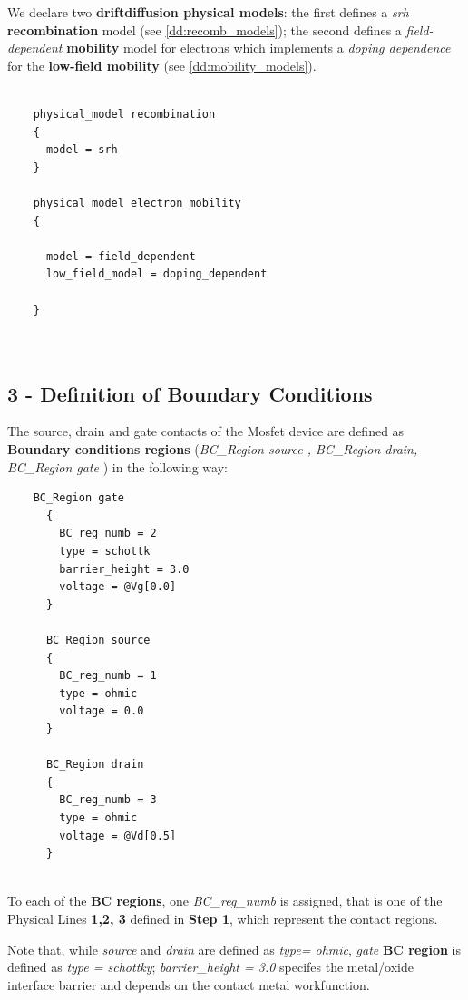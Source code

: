 We declare two \textbf{driftdiffusion physical models}:
 the  first defines a   \textit{srh} \textbf{recombination}  model (see \ref{dd:recomb_models}); the  second 
defines a \textit{field-dependent} \textbf{mobility} model for  electrons which implements a \textit{doping  dependence} for the \textbf{low-field  mobility} (see \ref{dd:mobility_models}).


\begin{verbatim}

    physical_model recombination
    {
      model = srh
    }

    physical_model electron_mobility
    {

      model = field_dependent
      low_field_model = doping_dependent   

    }



\end{verbatim}

\subsection* {3 - Definition of Boundary Conditions}
The source, drain  and gate contacts of the Mosfet device  are defined as \textbf{Boundary conditions regions} (\textit{BC\_Region source , BC\_Region drain, BC\_Region gate }) in the following way:

\begin{verbatim}
    BC_Region gate
      {
        BC_reg_numb = 2
        type = schottk
        barrier_height = 3.0
        voltage = @Vg[0.0]
      }

      BC_Region source
      {
        BC_reg_numb = 1
        type = ohmic
        voltage = 0.0
      }
 
      BC_Region drain
      {
        BC_reg_numb = 3
        type = ohmic
        voltage = @Vd[0.5]
      }


\end{verbatim}

To each of the  \textbf{BC regions}, one \textit{BC\_reg\_numb} is  assigned,  that  is  one  of the Physical Lines \textbf{1,2, 3} defined in \textbf{Step 1}, which represent the contact regions.

Note that, while \textit{source} and \textit{drain} are defined as \textit{type= ohmic},  \textit{gate} \textbf{BC region} is defined as \textit{type = schottky};
\textit{barrier\_height = 3.0} specifes the metal/oxide interface barrier and depends on the contact metal workfunction.

